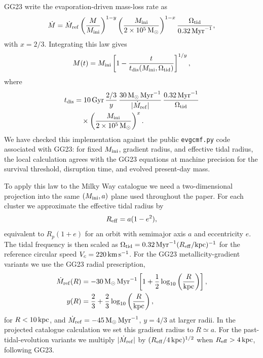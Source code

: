 \documentclass[fleqn,usenatbib]{mnras}
\begin{document}
GG23 write the evaporation-driven mass-loss rate as
\begin{equation}
\dot{M}
=
\dot{M}_{\rm ref}
\left(\frac{M}{M_{\rm ini}}\right)^{1-y}
\left(\frac{M_{\rm ini}}{2\times10^5\,{\rm M}_\odot}\right)^{1-x}
\frac{\Omega_{\rm tid}}{0.32\,{\rm Myr}^{-1}},
\end{equation}
with $x=2/3$. Integrating this law gives
\begin{equation}
M(t)=M_{\rm ini}
\left[
1-\frac{t}{t_{\rm dis}(M_{\rm ini},\Omega_{\rm tid})}
\right]^{1/y},
\end{equation}
where
\begin{equation}
\begin{aligned}
t_{\rm dis}
&=
10\,{\rm Gyr}\,
\frac{2/3}{y}\,
\frac{30\,{\rm M}_\odot\,{\rm Myr}^{-1}}{|\dot{M}_{\rm ref}|}\,
\frac{0.32\,{\rm Myr}^{-1}}{\Omega_{\rm tid}}\\
&\quad\times
\left(\frac{M_{\rm ini}}{2\times10^5\,{\rm M}_\odot}\right)^x .
\end{aligned}
\end{equation}
We have checked this implementation against the public \texttt{evgcmf.py} code associated with GG23: for fixed $M_{\rm ini}$, gradient radius, and effective tidal radius, the local calculation agrees with the GG23 equations at machine precision for the survival threshold, disruption time, and evolved present-day mass.

To apply this law to the Milky Way catalogue we need a two-dimensional projection into the same $(M_{\rm ini},a)$ plane used throughout the paper. For each cluster we approximate the effective tidal radius by
\begin{equation}
R_{\rm eff}=a(1-e^2),
\end{equation}
equivalent to $R_p(1+e)$ for an orbit with semimajor axis $a$ and eccentricity $e$. The tidal frequency is then scaled as $\Omega_{\rm tid}=0.32\,{\rm Myr}^{-1}(R_{\rm eff}/{\rm kpc})^{-1}$ for the reference circular speed $V_c=220\,{\rm km\,s^{-1}}$. For the GG23 metallicity-gradient variants we use the GG23 radial prescription,
\begin{align}
\dot{M}_{\rm ref}(R)&=-30\,{\rm M}_\odot\,{\rm Myr}^{-1}
\left[1+\frac{1}{2}\log_{10}\left(\frac{R}{{\rm kpc}}\right)\right],\\
y(R)&=\frac{2}{3}+\frac{2}{3}\log_{10}\left(\frac{R}{{\rm kpc}}\right),
\end{align}
for $R<10\,{\rm kpc}$, and $\dot{M}_{\rm ref}=-45\,{\rm M}_\odot\,{\rm Myr}^{-1}$, $y=4/3$ at larger radii. In the projected catalogue calculation we set this gradient radius to $R\simeq a$. For the past-tidal-evolution variants we multiply $|\dot{M}_{\rm ref}|$ by $(R_{\rm eff}/4\,{\rm kpc})^{1/2}$ when $R_{\rm eff}>4\,{\rm kpc}$, following GG23.
\end{document}
